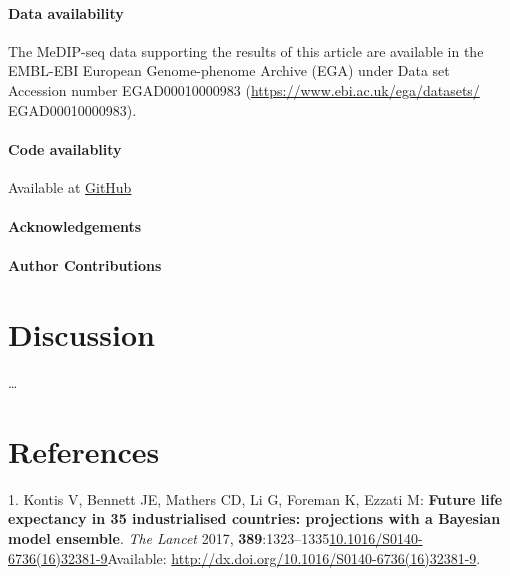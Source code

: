 \documentclass[
]{book}
\begin{document}
\hypertarget{data-availability-1}{%
\subsubsection{Data availability}\label{data-availability-1}}

The MeDIP-seq data supporting the results of this article are available in the EMBL-EBI European Genome-phenome Archive (EGA) under Data set Accession number EGAD00010000983 (\url{https://www.ebi.ac.uk/ega/datasets/}
EGAD00010000983).

\hypertarget{code-availablity-1}{%
\subsubsection{Code availablity}\label{code-availablity-1}}

Available at \href{https://github.com/richardjacton}{GitHub}

\newpage

\hypertarget{acknowledgements-2}{%
\subsubsection{Acknowledgements}\label{acknowledgements-2}}

\hypertarget{author-contributions-1}{%
\subsubsection{Author Contributions}\label{author-contributions-1}}

\newpage

\hypertarget{discussion-3}{%
\chapter{Discussion}\label{discussion-3}}

\ldots{}

\hypertarget{references}{%
\chapter*{References}\label{references}}

\hypertarget{refs}{}
\leavevmode\hypertarget{ref-Kontis2017}{}%
1. Kontis V, Bennett JE, Mathers CD, Li G, Foreman K, Ezzati M: \textbf{Future life expectancy in 35 industrialised countries: projections with a Bayesian model ensemble}. \emph{The Lancet} 2017, \textbf{389}:1323--1335\href{https://doi.org/10.1016/S0140-6736(16)32381-9}{10.1016/S0140-6736(16)32381-9}Available: \url{http://dx.doi.org/10.1016/S0140-6736(16)32381-9}.
\end{document}
